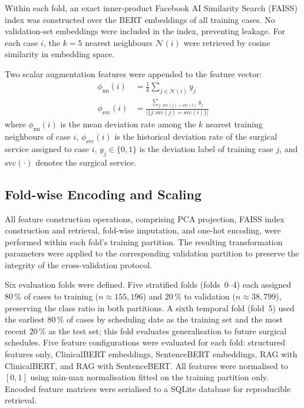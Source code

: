 Within each fold, an exact inner-product Facebook AI Similarity Search (FAISS)
index \citep{johnson2019billion} was constructed over the BERT embeddings of
all training cases.  No validation-set embeddings were included in the
index, preventing leakage.  For each case $i$, the $k = 5$ nearest neighbours
$\mathcal{N}(i)$ were retrieved by cosine similarity in embedding space.

Two scalar augmentation features were appended to the feature vector:
\begin{align}
  \phi_{\mathrm{nn}}(i)  &= \frac{1}{k}
      \sum_{j \in \mathcal{N}(i)} y_j
      \label{eq:phi_nn} \\[4pt]
  \phi_{\mathrm{svc}}(i) &=
      \frac{\displaystyle\sum_{j:\,\mathrm{svc}(j)=\mathrm{svc}(i)} y_j}
           {\displaystyle\bigl|\{j : \mathrm{svc}(j) = \mathrm{svc}(i)\}\bigr|}
      \label{eq:phi_svc}
\end{align}
where $\phi_{\mathrm{nn}}(i)$ is the mean deviation rate among the $k$ nearest
training neighbours of case $i$, $\phi_{\mathrm{svc}}(i)$ is the historical
deviation rate of the surgical service assigned to case $i$, $y_j \in \{0,1\}$
is the deviation label of training case $j$, and $\mathrm{svc}(\cdot)$ denotes
the surgical service.

\subsection{Fold-wise Encoding and Scaling}
\label{sec:folds}

All feature construction operations, comprising PCA projection, FAISS index
construction and retrieval, fold-wise imputation, and one-hot encoding, were
performed within each fold's training partition.  The resulting transformation
parameters were applied to the corresponding validation partition to preserve
the integrity of the cross-validation protocol.

Six evaluation folds were defined.  Five stratified folds (folds~0--4) each
assigned $80\,\%$ of cases to training ($n \approx 155{,}196$) and $20\,\%$ to
validation ($n \approx 38{,}799$), preserving the class ratio in both
partitions.  A sixth temporal fold (fold~5) used the earliest $80\,\%$ of
cases by scheduling date as the training set and the most recent $20\,\%$ as
the test set; this fold evaluates generalisation to future surgical schedules.
Five feature configurations were evaluated for each fold: structured features
only, ClinicalBERT embeddings, SentenceBERT embeddings, RAG with ClinicalBERT,
and RAG with SentenceBERT.  All features were normalised to $[0, 1]$ using
min-max normalisation fitted on the training partition only.  Encoded feature matrices were serialised to a SQLite database
for reproducible retrieval.

